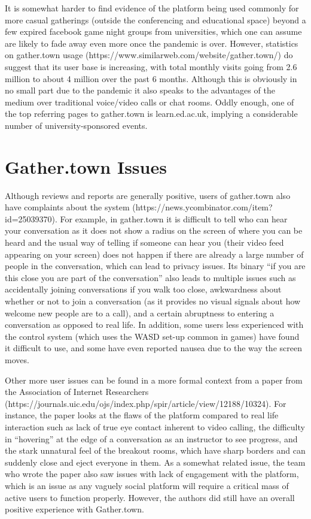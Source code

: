 \documentclass[bsc,frontabs,singlespacing,parskip,deptreport]{infthesis}
\begin{document}
It is somewhat harder to find evidence of the platform being used commonly for more casual gatherings (outside the conferencing and educational space) beyond a few expired facebook game night groups from universities, which one can assume are likely to fade away even more once the pandemic is over.  However, statistics on gather.town usage (https://www.similarweb.com/website/gather.town/) do suggest that its user base is increasing, with total monthly visits going from 2.6 million to about 4 million over the past 6 months.   Although this is obviously in no small part due to the pandemic it also speaks to the advantages of the medium over traditional voice/video calls or chat rooms. Oddly enough, one of the top referring pages to gather.town is learn.ed.ac.uk, implying a considerable number of university-sponsored events.

\section{Gather.town Issues}

Although reviews and reports are generally positive, users of gather.town also have complaints about the system (https://news.ycombinator.com/item?id=25039370).  For example, in gather.town it is difficult to tell who can hear your conversation as it does not show a radius on the screen of where you can be heard and the usual way of telling if someone can hear you (their video feed appearing on your screen) does not happen if there are already a large number of people in the conversation, which can lead to privacy issues.  Its binary “if you are this close you are part of the conversation” also leads to multiple issues such as accidentally joining conversations if you walk too close, awkwardness about whether or not to join a conversation (as it provides no visual signals about how welcome new people are to a call), and a certain abruptness to entering a conversation as opposed to real life.  In addition, some users less experienced with the control system (which uses the WASD set-up common in games) have found it difficult to use, and some have even reported nausea due to the way the screen moves.

Other more user issues can be found in a more formal context from a paper from the Association of Internet Researchers (https://journals.uic.edu/ojs/index.php/spir/article/view/12188/10324). For instance, the paper looks at the flaws of the platform compared to real life interaction such as lack of true eye contact inherent to video calling, the difficulty in “hovering” at the edge of a conversation as an instructor to see progress, and the stark unnatural feel of the breakout rooms, which have sharp borders and can suddenly close and eject everyone in them.  As a somewhat related issue, the team who wrote the paper also saw issues with lack of engagement with the platform, which is an issue as any vaguely social platform will require a critical mass of active users to function properly.  However, the authors did still have an overall positive experience with Gather.town.
\end{document}
